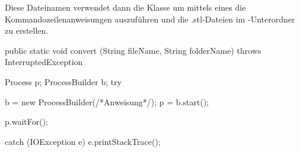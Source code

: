 Diese Dateinamen verwendet dann die Klasse  um mittels eines  die Kommandozeilenanweisungen auszuführen und die .stl-Dateien im -Unterordner zu erstellen.

\begin{code}
	public static void convert (String fileName, String folderName) throws InterruptedException {
		Process p;
		ProcessBuilder b;
		try {
			b = new ProcessBuilder(/*Anweisung*/);
			p = b.start();
						
			p.waitFor();
		} catch (IOException e) {
			e.printStackTrace();
		}
	}
\end{code}